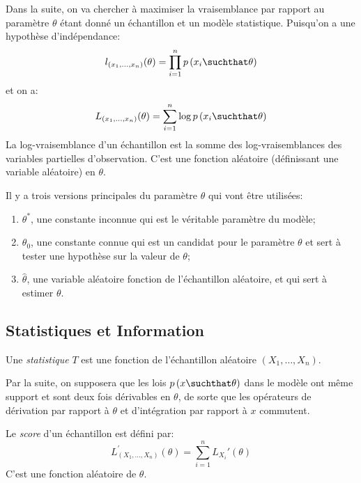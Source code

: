 \documentclass[info, math, french]{mpb-cours}
\def\model#1#2{p\left(#1\suchthat#2\right)}
\def\define#1{\emph{\textcolor{vulm}{#1}}}
\begin{document}
Dans la suite, on va chercher à maximiser la vraisemblance par rapport au paramètre $\theta$ étant donné un échantillon et un modèle statistique.
Puisqu'on a une hypothèse d'indépendance:
\begin{equation*}
	l_{(x_{1}, \ldots, x_{n})}(\theta) = \prod_{i = 1}^{n}\model{x_{i}}{\theta}
\end{equation*}
et on a:
\begin{equation*}
	L_{(x_{1}, \ldots, x_{n})}(\theta) = \sum_{i = 1}^{n}\log\model{x_{i}}{\theta}
\end{equation*}
La log-vraisemblance d'un échantillon est la somme des log-vraisemblances des variables partielles d'observation.
C'est une fonction aléatoire (définissant une variable aléatoire) en $\theta$.

Il y a trois versions principales du paramètre $\theta$ qui vont être utilisées:
\begin{enumerate}
	\item $\theta^{*}$, une constante inconnue qui est le véritable paramètre du modèle;
	\item $\theta_{0}$, une constante connue qui est un candidat pour le paramètre $\theta$ et sert à tester
	      une hypothèse sur la valeur de $\theta$;
	\item $\hat{\theta}$, une variable aléatoire fonction de l'échantillon aléatoire, et qui sert à estimer $\theta$.
\end{enumerate}

\subsection{Statistiques et Information}
\begin{definition}
	Une \define{statistique} $T$ est une fonction de l'échantillon aléatoire $(X_{1}, \ldots, X_{n})$.
\end{definition}

Par la suite, on supposera que les lois $\model{x}{\theta}$ dans le modèle ont même support et sont deux
fois dérivables en $\theta$,
de sorte que les opérateurs de dérivation par rapport à $\theta$ et d'intégration par rapport à $x$ commutent.

\begin{definition}
	Le \define{score} d'un échantillon est défini par:
	\begin{equation*}
		L_{(X_{1}, \ldots, X_{n})}^{'}(\theta) = \sum_{i = 1}^{n} L_{X_{i}}'(\theta)
	\end{equation*}
	C'est une fonction aléatoire de $\theta$.
\end{definition}
\end{document}
